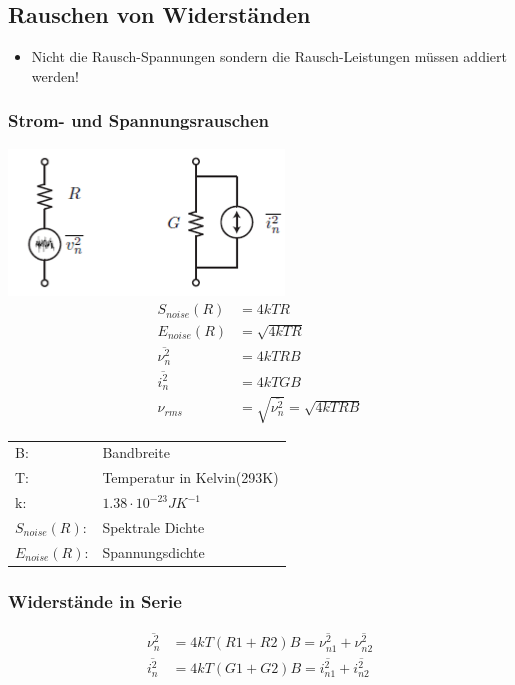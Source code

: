 \subsection{Rauschen von Widerständen}
\begin{itemize}
  \item Nicht die Rausch-Spannungen sondern die Rausch-Leistungen müssen addiert werden!
\end{itemize}
\subsubsection{Strom- und Spannungsrauschen}
\begin{multicols}{3}
	\includegraphics[scale=0.5]{pictures/widerstandrauschen}
	\columnbreak
	\begin{align*}
		S_{noise}(R) &=4kTR\\
		E_{noise}(R) &=\sqrt{4kTR}\\
		\overline{\nu^2_{n}} &=4kTRB\\
		\overline{i^2_{n}} &=4kTGB\\
		\nu_{rms} &= \sqrt{\overline{\nu^2_{n}}} = \sqrt{4kTRB}
	\end{align*}
	\begin{tabular}{ll}
		B:&Bandbreite\\
		T:&Temperatur in Kelvin(293K)\\
		k:&$1.38 \cdot 10^{-23}JK^{-1}$\\
		$S_{noise}(R)$:&Spektrale Dichte\\
		$E_{noise}(R)$:&Spannungsdichte
	\end{tabular}
\end{multicols}

\subsubsection{Widerstände in Serie}
\begin{minipage}{0.4\textwidth}
	\begin{center}
		
	\end{center}
\end{minipage}
\begin{minipage}{0.6\textwidth}
	\begin{align*}
		\overline{\nu^2_{n}}&=4kT(R1+R2)B=\overline{\nu^2_{n1}}+\overline{\nu^2_{n2}}\\
		\overline{i^2_{n}}&=4kT(G1+G2)B=\overline{i^2_{n1}}+\overline{i^2_{n2}}
	\end{align*}
\end{minipage}

